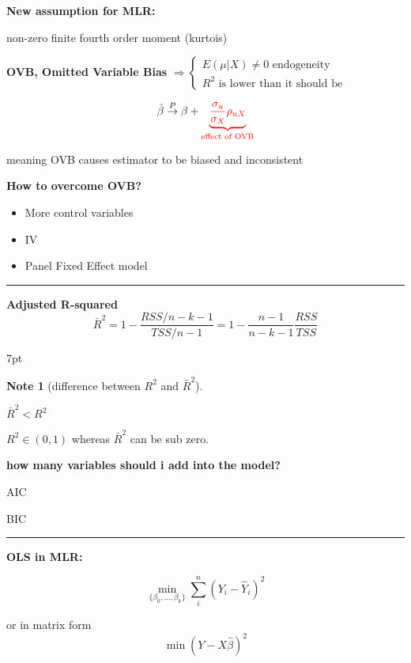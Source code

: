 \documentclass{article}
\providecommand{\tightlist}{
  \setlength{\itemsep}{0pt}
  \setlength{\parskip}{0pt}}
\newcommand*\sepline{%
  \begin{center}
    \rule[1ex]{.5\textwidth}{.5pt}
  \end{center}}
\newenvironment{blueblock}{
\def\FrameCommand{
  \hspace{1pt}
    {\color{DarkBlue}
    \vrule width 2pt}
    {\color{blueshade}
    \vrule width 4pt}
  \colorbox{blueshade}
}
\MakeFramed{
  \advance
  \hsize-
  \width
  \FrameRestore}
\noindent\hspace{-4.55pt}%
\begin{adjustwidth}{}{7pt}
\vspace{2pt}\vspace{2pt}
}
{\vspace{2pt}\end{adjustwidth}\endMakeFramed}
\newtheorem{note}{Note}
\begin{document}
\textbf{New assumption for MLR:}

non-zero finite fourth order moment (kurtois)


\textbf{OVB, Omitted Variable Bias }
$\Rightarrow 
\begin{cases}
  E(\mu|X)\neq 0 \text{ endogeneity}  
  \\
  R^2 \text{ is lower than it should be} 
\end{cases}$

\begin{equation}
  \hat{\beta}\stackrel{P}{\rightarrow}\beta+
  \color{red}
  \underbrace{\frac{\sigma_u}{\sigma_X}\rho_{uX}}_{\text{effect of OVB}}
\end{equation}

meaning OVB causes estimator to be biased and inconsistent

\textbf{How to overcome OVB?}
\begin{itemize}
\tightlist
  \item More control variables
  \item IV
  \item Panel Fixed Effect model
\end{itemize}

\sepline

\textbf{Adjusted R-squared}
\begin{equation}
  \bar R^2=1-\frac{RSS/n-k-1}{TSS/n-1}=1-\frac{n-1}{n-k-1}\frac{RSS}{TSS}
\end{equation}

\begin{blueblock}
\begin{note}[difference between $R^2$ and $\bar R^2$]
\end{note}
$\bar R^2<R^2$

$R^2 \in (0,1)$ whereas $\bar R^2 $ can be sub zero.
\end{blueblock}


\textbf{how many variables should i add into the model?}

AIC

BIC

\sepline

\textbf{OLS in MLR:}

\begin{equation}
  \min\limits_{\{\beta_0,\dots,\beta_k\}} \sum\limits_i^n (Y_i-\hat Y_i)^2
\end{equation}

or in matrix form
\begin{equation}
  \min (Y-X \hat{\beta} )^2
\end{equation}
\end{document}
